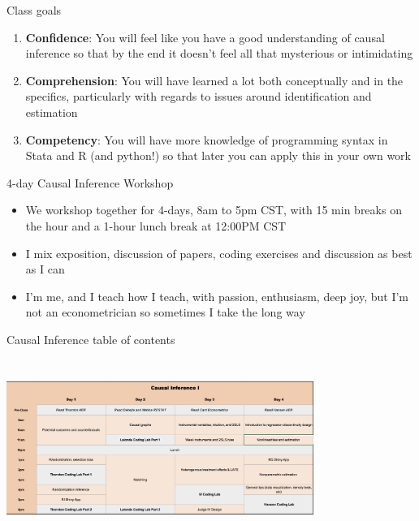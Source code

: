 \documentclass{beamer}
\begin{document}
\begin{frame}{Class goals}

  \begin{enumerate}
    \item \textbf{Confidence}: You will feel like you have a good understanding of causal inference so that by the end it doesn't feel all that mysterious or intimidating
    \item \textbf{Comprehension}: You will have learned a lot both conceptually and in the specifics, particularly with regards to issues around identification and estimation
    \item \textbf{Competency}: You will have more knowledge of programming syntax in Stata and R (and python!) so that later you can apply this in your own work
  \end{enumerate}

\end{frame}

\begin{frame}{4-day Causal Inference Workshop}

  \begin{itemize}
    \item We workshop together for 4-days, 8am to 5pm CST, with 15 min breaks on the hour and a 1-hour lunch break at 12:00PM CST
    \item I mix exposition, discussion of papers, coding exercises and discussion as best as I can
    \item I'm me, and I teach how I teach, with passion, enthusiasm, deep joy, but I'm not an econometrician so sometimes I take the long way
  \end{itemize}

\end{frame}

\begin{frame}{Causal Inference table of contents}
  \centering
  \includegraphics[scale=0.5,height=6.5cm, width=10cm]{./lecture_includes/part1}
\end{frame}
\end{document}

